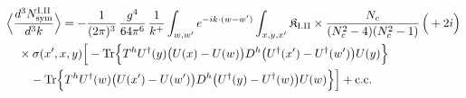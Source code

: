 \begingroup\small
\begin{align}\label{eq:S-I.II-3}
&\Big\langle\frac{d^{3}N^{\rm I.II}_{{\rm sym}}}{d^{3}k}\Big\rangle=-\frac{1}{(2\pi)^{3}}\, \frac{g^{4}}{64\pi^{6}}\, \frac{1}{k^{+}} \int_{w,w'}e^{-ik\cdot(w-w')} \int_{x,y,x'} \mathfrak{K}_{\rm I.II} \times \frac{N_{c}}{(N_{c}^{2}-4)(N_{c}^{2}-1)}\, \Big(+2i\Big)\notag\\
&\quad \times \sigma(x',x,y)\Big[ -{\rm Tr}\Big\{T^{h}U^{\dagger}(y)\big(U(x)-U(w)\big)D^{h}\big(U^{\dagger}(x')-U^{\dagger}(w')\big)U(y)\Big\}\notag\\
&\quad\quad -{\rm Tr}\Big\{T^{h}U^{\dagger}(w)\big(U(x')-U(w')\big)D^{h}\big(U^{\dagger}(y)-U^{\dagger}(w)\big)U(w)\Big\}\Big] +{\rm c.c.}
\end{align}
\endgroup
